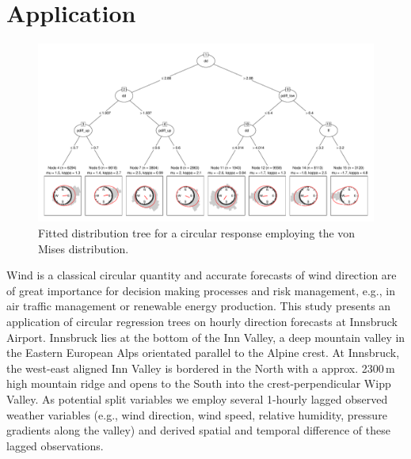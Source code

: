 \documentclass[twoside]{report}
\begin{document}
\section{Application}

\begin{figure}[!ht]\centering
\includegraphics[height = .5\textheight,angle=90,origin=c]{circtree_plot_big.pdf}
\caption{Fitted distribution tree for a circular response employing the von Mises distribution.}
\label{fig:tree}
\end{figure}

Wind is a classical circular quantity and accurate forecasts of wind direction
are of great importance for decision making processes and risk management,
e.g., in air traffic management or renewable energy production. This study
presents an application of circular regression trees  on hourly direction
forecasts at Innsbruck Airport.  Innsbruck lies at the bottom of the Inn
Valley, a deep mountain valley in the Eastern European Alps orientated parallel
to the Alpine crest. At Innsbruck, the west-east aligned Inn Valley is bordered
in the North with a approx. 2300\,m high mountain ridge and opens to the South
into the crest-perpendicular Wipp Valley. As potential split variables we
employ several 1-hourly lagged observed weather variables (e.g., wind
direction, wind speed, relative humidity, pressure gradients along the valley)
and derived spatial and temporal difference of these lagged observations. 
\end{document}
